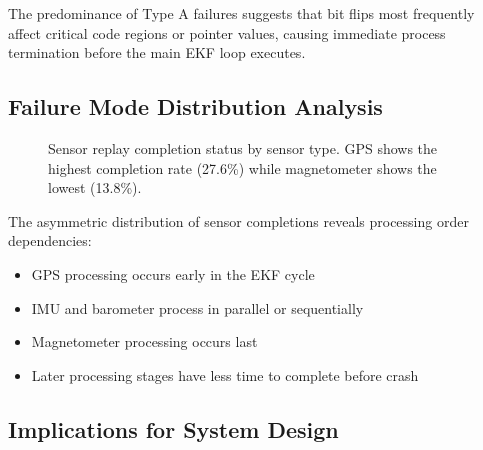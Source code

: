\documentclass[11pt,a4paper]{article}
\begin{document}
The predominance of Type A failures suggests that bit flips most frequently affect critical code regions or pointer values, causing immediate process termination before the main EKF loop executes.

\subsection{Failure Mode Distribution Analysis}

\begin{figure}[H]
\centering
{}
\caption{Sensor replay completion status by sensor type. GPS shows the highest completion rate (27.6\%) while magnetometer shows the lowest (13.8\%).}
\label{fig:sensor_completion}
\end{figure}

The asymmetric distribution of sensor completions reveals processing order dependencies:

\begin{itemize}
  \item GPS processing occurs early in the EKF cycle
  \item IMU and barometer process in parallel or sequentially
  \item Magnetometer processing occurs last
  \item Later processing stages have less time to complete before crash
\end{itemize}

\subsection{Implications for System Design}
\end{document}
